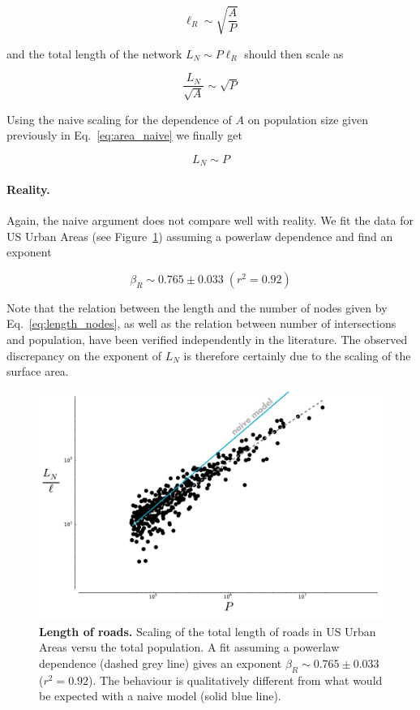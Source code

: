 \begin{equation} 
    \ell_R \sim \sqrt{\frac{A}{P}} 
    \label{eq:length_nodes}
\end{equation}

and the total length of the network $L_N \sim P\ell_R$ should then scale as

\begin{equation} 
    \frac{L_N}{\sqrt{A}} \sim \sqrt{P} 
\end{equation}

Using the naive scaling for the dependence of $A$ on population size given
previously in Eq.~\ref{eq:area_naive} we finally get 

\begin{equation} 
    L_N \sim P
\end{equation}

\paragraph{Reality.} Again, the naive argument does not compare well with
reality. We fit the data for US Urban Areas (see
Figure~\ref{fig:scaling_lanemiles}) assuming a powerlaw dependence and find an
exponent

\begin{equation}
    \boxed{\beta_R \sim 0.765 \pm 0.033\;(r^2 = 0.92)}
\end{equation}

Note that the relation between the length and the number of nodes given by
Eq.~\ref{eq:length_nodes}, as well as the relation between number of
intersections and population, have been verified independently in the
literature. The observed discrepancy on the exponent of $L_N$ is therefore
certainly due to the scaling of the surface area.

\begin{figure}
    \centering
    \includegraphics[width=\textwidth]{gfx/chapter-scaling/scaling_lanemiles.pdf}
    \caption{{\bf Length of roads.} Scaling of the total length of roads in US Urban Areas versu the
    total population. A fit assuming a powerlaw dependence (dashed grey line)
gives an exponent $\beta_R \sim 0.765 \pm 0.033$ ($r^2=0.92$). The behaviour is
qualitatively different from what would be expected with a naive model (solid
blue line).\label{fig:scaling_lanemiles}}
\end{figure}




